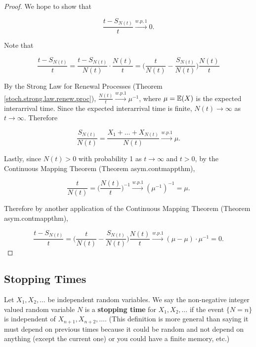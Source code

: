 \begin{proof}

We hope to show that

\[
\frac{ t - S_{N(t)}}{t} \xrightarrow{w.p,1} 0 .
\]

Note that

\[
\frac{ t - S_{N(t)}}{t}  = \frac{ t - S_{N(t)}}{N(t)}  \cdot \frac{ N(t)}{t} =  \bigg(  \frac{ t}{N(t)} -  \frac{S_{N(t)}}{N(t)}     \bigg) \frac{ N(t)}{t} 
\]

By the Strong Law for Renewal Processes (Theorem \ref{stoch.strong.law.renew.proc}), \(\frac{ N(t)}{t} \xrightarrow{w.p.1} \mu^{-1}\), where \(\mu =\mathbb{E}(X)\) is the expected interarrival time. Since the expected interarrival time is finite, \(N(t) \to \infty\) as \(t \to \infty\). Therefore

\[
 \frac{S_{N(t)}}{N(t)} = \frac{X_1 + \ldots + X_{N(t)}}{N(t)} \xrightarrow{w.p.1} \mu.
\]

Lastly, since \(N(t) > 0 \) with probability 1 as \(t \to \infty\) and \(t > 0\), by the Continuous Mapping Theorem (Theorem {asym.contmappthm}),

\[
\frac{ t}{N(t)} =  \bigg( \frac{ N(t)}{t} \bigg)^{-1}  \xrightarrow{w.p.1} (\mu^{-1})^{-1} = \mu.
\]

Therefore by another application of the Continuous Mapping Theorem (Theorem {asym.contmappthm}),

\[
\frac{ t - S_{N(t)}}{t} = \bigg(  \frac{ t}{N(t)} -  \frac{S_{N(t)}}{N(t)}     \bigg) \frac{ N(t)}{t}  \xrightarrow{w.p.1} ( \mu - \mu) \cdot \mu^{-1} = 0.
\]

\end{proof}

\subsection{Stopping Times}

\begin{definition} Let \(X_1, X_2, \ldots\) be independent random variables. We say the non-negative integer valued random variable \(N\) is a \textbf{stopping time} for \(X_1, X_2, \ldots\) if the event \(\{ N = n\}\) is independent of \(X_{n+1}, X_{n+2}, \ldots\). (This definition is more general than saying it must depend on previous times because it could be random and not depend on anything (except the current one) or you could have a finite memory, etc.)

\end{definition}

